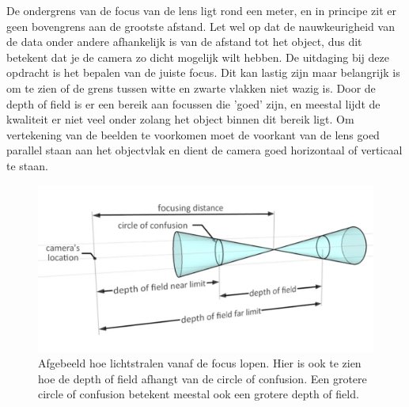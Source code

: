 \documentclass{article}
\begin{document}
De ondergrens van de focus van de lens ligt rond een meter, en in principe zit er geen bovengrens aan de grootste afstand. Let wel op dat de nauwkeurigheid van de data onder andere afhankelijk is van de afstand tot het object, dus dit betekent dat je de camera zo dicht mogelijk wilt hebben. De uitdaging bij deze opdracht is het bepalen van de juiste focus. Dit kan lastig zijn maar belangrijk is om te zien of de grens tussen witte en zwarte vlakken niet wazig is. Door de depth of field is er een bereik aan focussen die 'goed' zijn, en meestal lijdt de kwaliteit er niet veel onder zolang het object binnen dit bereik ligt. Om vertekening van de beelden te voorkomen moet de voorkant van de lens goed parallel staan aan het objectvlak en dient de camera goed horizontaal of verticaal te staan.

\begin{figure}
    \centering
    \includegraphics[width=\textwidth]{figures/dof.png}
    \caption{Afgebeeld hoe lichtstralen vanaf de focus lopen. Hier is ook te zien hoe de depth of field afhangt van de circle of confusion. Een grotere circle of confusion betekent meestal ook een grotere depth of field.}
    \label{fig:dof}
\end{figure}
\end{document}

